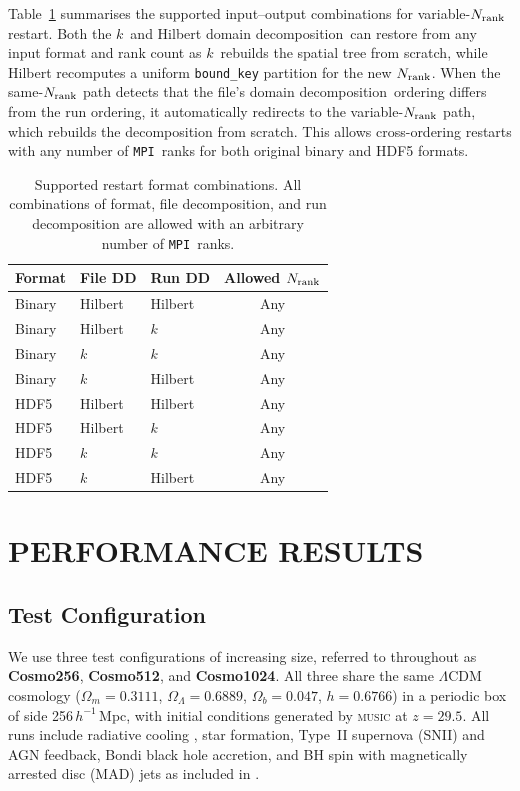 \documentclass[fleqn,usenatbib]{mnras}
\newcommand{\nrank}{N_{\rm rank}}
\newcommand{\ksec}{\ensuremath{k}\text{-section}}
\newcommand{\code}[1]{\texttt{#1}}
\newcommand{\mpi}[0]{\texttt{MPI}}
\newcommand{\dd}[0]{{domain decomposition}}
\begin{document}
Table~\ref{tab:restart_compat} summarises the supported
input--output combinations for variable-$\nrank$ restart.
Both the \ksec\ and Hilbert \dd\ can restore from
any input format and rank count as \ksec\ rebuilds the spatial
tree from scratch, while Hilbert recomputes a uniform
\code{bound\_key} partition for the new $\nrank$.
When the same-$\nrank$ path detects that the file's \dd\ ordering differs from the run ordering, it automatically
redirects to the variable-$\nrank$ path, which rebuilds the
decomposition from scratch.  This allows cross-ordering restarts
with any number of \mpi\ ranks for both original binary and HDF5 formats.
\begin{table}
\centering
\caption{Supported restart format combinations.
All combinations of format, file decomposition, and run decomposition
are allowed with an arbitrary number of \mpi\ ranks.}
\label{tab:restart_compat}
\small
\begin{tabular}{@{}lllc@{}}
\toprule
Format & File DD & Run DD & Allowed $\nrank$ \\
\midrule
Binary & Hilbert & Hilbert & Any \\
Binary & Hilbert & \ksec   & Any \\
Binary & \ksec   & \ksec   & Any \\
Binary & \ksec   & Hilbert & Any \\
HDF5   & Hilbert & Hilbert & Any \\
HDF5   & Hilbert & \ksec   & Any \\
HDF5   & \ksec   & \ksec   & Any \\
HDF5   & \ksec   & Hilbert & Any \\
\bottomrule
\end{tabular}
\end{table}

\section{PERFORMANCE RESULTS}
\label{sec:performance}

\subsection{Test Configuration}
\label{sec:perf_config}

We use three test configurations of increasing size, referred to
throughout as \textbf{Cosmo256}, \textbf{Cosmo512}, and
\textbf{Cosmo1024}.  All three share the same $\Lambda$CDM cosmology
($\Omega_m = 0.3111$, $\Omega_\Lambda = 0.6889$, $\Omega_b = 0.047$,
$h = 0.6766$) in a periodic box of side 256\,$h^{-1}$\,Mpc, with
initial conditions generated by \textsc{music} \citep{Hahn2011} at
$z = 29.5$.  All runs include radiative cooling \citep[Haardt \&
Madau background;][]{HaardtMadau2012}, star formation, Type~II
supernova (SNII) and AGN feedback, Bondi black hole accretion, and BH spin with magnetically arrested disc (MAD) jets as included in \cite{Lee2021}.
\end{document}
